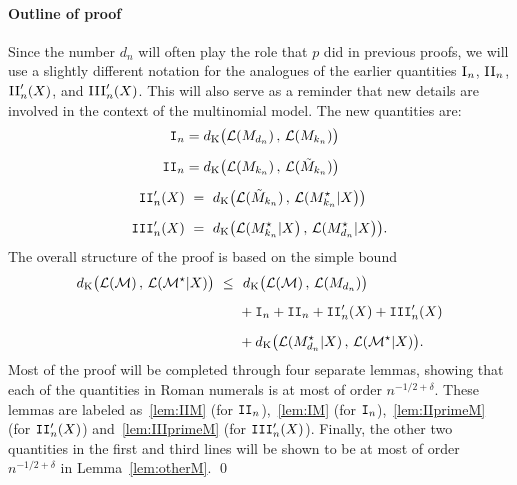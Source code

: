 \documentclass[aos,preprint]{imsart}
\numberwithin{equation}{section}
\theoremstyle{plain}
\newcommand{\M}{\mathcal{M}}
\newcommand{\I}{\textsc{I}}
\newcommand{\II}{\textsc{II}}
\newcommand{\III}{\textsc{III}}
\newcommand{\bI}{\textup{\texttt{I}}}
\newcommand{\bII}{\textup{\texttt{II}}}
\newcommand{\bIII}{\textup{\texttt{III}}}
\renewcommand{\L}{\mathcal{L}}
\newcommand{\1}{{\bf{1}}}
\newcommand{\0}{\mathbf{0}}
\begin{document}
\paragraph{Outline of proof} Since the number $d_n$ will often play the role that $p$ did in previous proofs, we will use a slightly different notation for the analogues of the earlier quantities $\I_n$, $\II_n$, $\II_n'(X)$, and $\III_n'(X)$. This will also serve as a reminder that new details are involved in the context of the multinomial model. The new quantities are:
\begin{align*}
\bI_n &= d_{\text{K}}\big(\mathcal{L}(M_{d_n}) \, , \, \mathcal{L}(M_{k_n})\big)\\[0.2cm]
%
\bII_n &=d_{\text{K}}\big( \mathcal{L}(M_{k_n})\, , \, \mathcal{L}(\tilde M_{k_n})\big)\\[0.2cm]
%
%
\bII'_n(X) &\ = \ d_{\text{K}}\big(\mathcal{L}(\tilde M_{k_n}) \, , \, \mathcal{L}( M^{\star}_{k_n}|X\big)\big)\\[0.2cm]
%
\bIII'_n(X) & \ = \ d_{\text{K}}\big(\mathcal{L}(M^{\star}_{k_n}| X\big) \, , \, \mathcal{L}( M_{d_n}^{\star} |X\big)\big).
\end{align*}
The overall structure of the proof is based on the simple bound
\begin{equation*}\label{eqn:threepartsM}
\begin{split}
   d_{\textup{K}}\big(\L(\M)\,,\,\L(\M^{\star}|X)\big) \ \leq & \  \ d_{\textup{K}}\big(\L(\M) \, ,\,\L(M_{d_n})\big)\\[0.2cm]
   & \ + \bI_n +\bII_n+\bII_n'(X)+\bIII_n'(X)\\[0.2cm]
   & \ + d_{\textup{K}}\big(\L(M_{d_n}^{\star}|X) \, , \, \L(\M^{\star}|X)\big).
   \end{split}
\end{equation*}
Most of the proof will be completed through four separate lemmas, showing that each of the quantities in Roman numerals is at most of order $n^{-1/2+\delta}$. These lemmas are labeled as~\ref{lem:IIM} (for $\bII_n$),~\ref{lem:IM} (for $\bI_n$),~\ref{lem:IIprimeM} (for $\bII'_n(X)$) and~\ref{lem:IIIprimeM} (for $\bIII_n'(X)$). Finally, the other two quantities in the first and third lines %
will be shown to be at most of order $n^{-1/2+\delta}$ in Lemma~\ref{lem:otherM}. \qed
~\\
\end{document}
